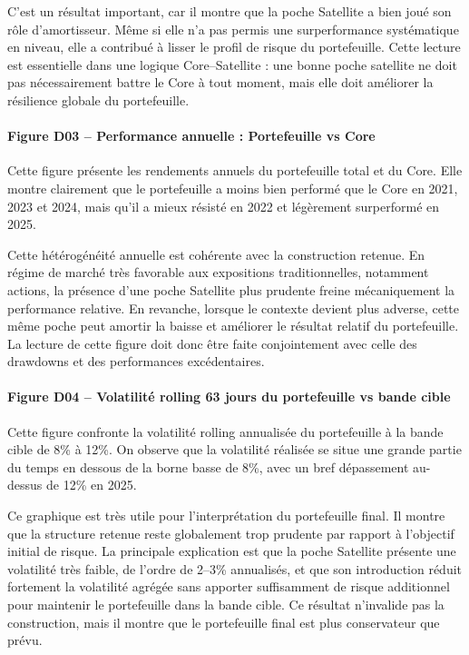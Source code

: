 \documentclass{article}
\begin{document}
C’est un résultat important, car il montre que la poche Satellite a bien joué son rôle d’amortisseur. Même si elle n’a pas permis une surperformance systématique en niveau, elle a contribué à lisser le profil de risque du portefeuille. Cette lecture est essentielle dans une logique Core--Satellite : une bonne poche satellite ne doit pas nécessairement battre le Core à tout moment, mais elle doit améliorer la résilience globale du portefeuille.

\paragraph{Figure D03 -- Performance annuelle : Portefeuille vs Core}
Cette figure présente les rendements annuels du portefeuille total et du Core. Elle montre clairement que le portefeuille a moins bien performé que le Core en 2021, 2023 et 2024, mais qu’il a mieux résisté en 2022 et légèrement surperformé en 2025.

Cette hétérogénéité annuelle est cohérente avec la construction retenue. En régime de marché très favorable aux expositions traditionnelles, notamment actions, la présence d’une poche Satellite plus prudente freine mécaniquement la performance relative. En revanche, lorsque le contexte devient plus adverse, cette même poche peut amortir la baisse et améliorer le résultat relatif du portefeuille. La lecture de cette figure doit donc être faite conjointement avec celle des drawdowns et des performances excédentaires.

\paragraph{Figure D04 -- Volatilité rolling 63 jours du portefeuille vs bande cible}
Cette figure confronte la volatilité rolling annualisée du portefeuille à la bande cible de 8\% à 12\%. On observe que la volatilité réalisée se situe une grande partie du temps en dessous de la borne basse de 8\%, avec un bref dépassement au-dessus de 12\% en 2025.

Ce graphique est très utile pour l’interprétation du portefeuille final. Il montre que la structure retenue reste globalement trop prudente par rapport à l’objectif initial de risque. La principale explication est que la poche Satellite présente une volatilité très faible, de l’ordre de 2--3\% annualisés, et que son introduction réduit fortement la volatilité agrégée sans apporter suffisamment de risque additionnel pour maintenir le portefeuille dans la bande cible. Ce résultat n’invalide pas la construction, mais il montre que le portefeuille final est plus conservateur que prévu.
\end{document}
